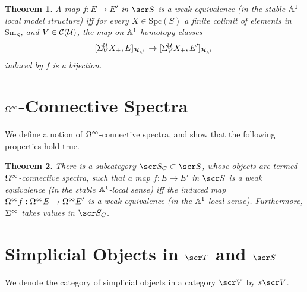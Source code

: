 \documentclass{amsart}
\newtheorem{thm}{Theorem}[section]
\theoremstyle{definition}
\begin{document}
\begin{thm}
A map $f : E \to E'$ in $\sS$ is a weak-equivalence (in the stable $\mathbb{A}^1$-local model structure) iff for every $X \in \mathrm{Spc}(S)$ a finite colimit of elements in $\mathrm{Sm}_S$, and $V \in {\mathcal{C}}({\mathcal{U}})$, the map on $\mathbb{A}^1$-homotopy classes \[[\Sigma_V^{{\mathcal{U}}}X_{+},E]_{{\mathcal{H}}_{\mathbb{A}^1}} \to [\Sigma_V^{{\mathcal{U}}}X_{+},E']_{{\mathcal{H}}_{\mathbb{A}^1}}\] \noindent induced by $f$ is a bijection.
\end{thm}

\section{$\Omega^{\infty}$-Connective Spectra}\label{sec:weq_connec}
We define a notion of $\Omega^{\infty}$-connective spectra, and show that the following properties hold true.

\begin{thm}
There is a subcategory $\sS_{C} \subset \sS$, whose objects are termed $\Omega^{\infty}$-connective spectra, such that a map $f:E \to E'$ in $\sS$ is a weak equivalence (in the stable $\mathbb{A}^1$-local sense) iff the induced map $\Omega^{\infty}f: \Omega^{\infty}E \to \Omega^{\infty}E'$ is a weak equivalence (in the $\mathbb{A}^1$-local sense). Furthermore, $\Sigma^{\infty}$ takes values in $\sS_C$.
\end{thm}

\section{Simplicial Objects in $\sT$ and $\sS$}\label{sec:simp}
We denote the category of simplicial objects in a category $\sV$ by $s\sV$.
\end{document}
